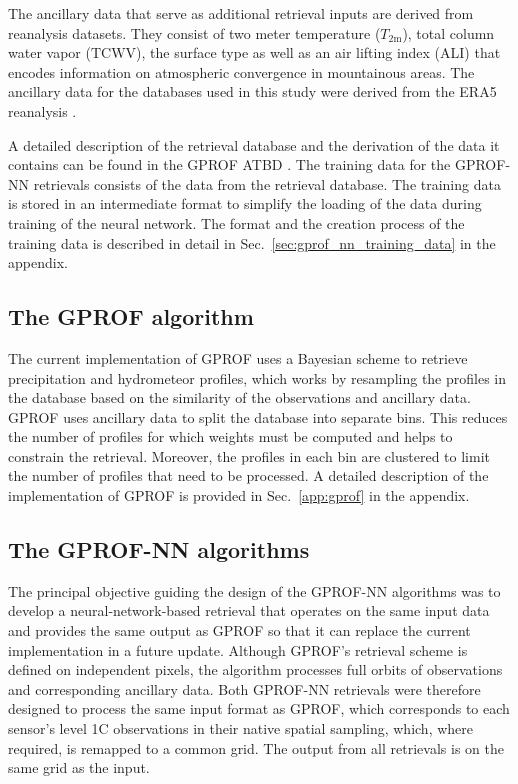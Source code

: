 \documentclass[journal abbreviation, manuscript]{copernicus}
\begin{document}
The ancillary data that serve as additional retrieval inputs are derived from
reanalysis datasets. They consist of two meter temperature ($T_{\text{2m}}$),
total column water vapor ($\text{TCWV}$), the surface type as well as an air
lifting index (ALI) that encodes information on atmospheric convergence in
mountainous areas. The ancillary data for the databases used in this study were
derived from the ERA5 reanalysis \citep{hersbach20}.

A detailed description of the retrieval database and the derivation of the data
it contains can be found in the GPROF ATBD \citep{atbd}. The training data for the
GPROF-NN retrievals consists of the data from the retrieval database. The
training data is stored in an intermediate format to simplify the loading of the
data during training of the neural network. The format and the creation process
of the training data is described in detail in Sec.~\ref{sec:gprof_nn_training_data}
in the appendix.


\subsection{The GPROF algorithm}
\label{sec:gprof}

The current implementation of GPROF uses a Bayesian scheme to retrieve
precipitation and hydrometeor profiles, which works by resampling the profiles
in the database based on the similarity of the observations and ancillary data.
GPROF uses ancillary data to split the database into separate bins. This reduces
the number of profiles for which weights must be computed and helps to constrain
the retrieval. Moreover, the profiles in each bin are clustered to limit the
number of profiles that need to be processed. A detailed description of the
implementation of GPROF is provided in Sec.~\ref{app:gprof} in the appendix.

\subsection{The GPROF-NN algorithms}

The principal objective guiding the design of the GPROF-NN algorithms was to
develop a neural-network-based retrieval that operates on the same input data
and provides the same output as GPROF so that it can replace the current
implementation in a future update. Although GPROF's retrieval scheme is defined
on independent pixels, the algorithm processes full orbits of observations and
corresponding ancillary data. Both GPROF-NN retrievals were therefore designed
to process the same input format as GPROF, which corresponds to each sensor's
level 1C observations in their native spatial sampling, which, where required,
is remapped to a common grid. The output from all retrievals is on the same grid
as the input.
\end{document}
